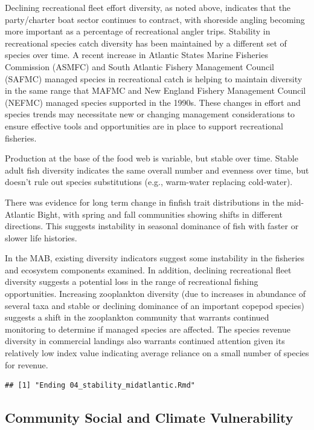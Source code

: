 \documentclass[
  10pt,
]{article}
\begin{document}
Declining recreational fleet effort diversity, as noted above, indicates that the party/charter boat sector continues to contract, with shoreside angling becoming more important as a percentage of recreational angler trips. Stability in recreational species catch diversity has been maintained by a different set of species over time. A recent increase in Atlantic States Marine Fisheries Commission (ASMFC) and South Atlantic Fishery Management Council (SAFMC) managed species in recreational catch is helping to maintain diversity in the same range that MAFMC and New England Fishery Management Council (NEFMC) managed species supported in the 1990s. These changes in effort and species trends may necessitate new or changing management considerations to ensure effective tools and opportunities are in place to support recreational fisheries.

Production at the base of the food web is variable, but stable over time. Stable adult fish diversity indicates the same overall number and evenness over time, but doesn't rule out species substitutions (e.g., warm-water replacing cold-water).

There was evidence for long term change in finfish trait distributions in the mid-Atlantic Bight, with spring and fall communities showing shifts in different directions. This suggests instability in seasonal dominance of fish with faster or slower life histories.

In the MAB, existing diversity indicators suggest some instability in the fisheries and ecosystem components examined. In addition, declining recreational fleet diversity suggests a potential loss in the range of recreational fishing opportunities. Increasing zooplankton diversity (due to increases in abundance of several taxa and stable or declining dominance of an important copepod species) suggests a shift in the zooplankton community that warrants continued monitoring to determine if managed species are affected. The species revenue diversity in commercial landings also warrants continued attention given its relatively low index value indicating average reliance on a small number of species for revenue.

\begin{verbatim}
## [1] "Ending 04_stability_midatlantic.Rmd"
\end{verbatim}

\subsection{Community Social and Climate Vulnerability}\label{community-social-and-climate-vulnerability}
\end{document}
